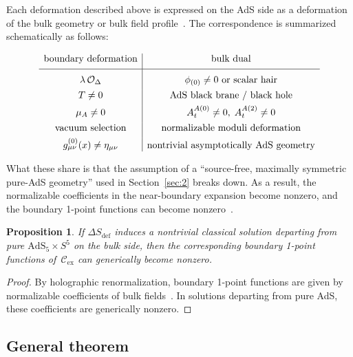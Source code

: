 \documentclass[
  aps,
  prd,
  preprint,
  groupedaddress,
  nofootinbib,
  longbibliography
]{revtex4-2}
\newtheorem{proposition}[definition]{Proposition}
\theoremstyle{remark}
\newcommand{\Cex}{\mathcal{C}_{\mathrm{ex}}}
\newcommand{\AdS}{\mathrm{AdS}}
\begin{document}
Each deformation described above is expressed on the AdS side
as a deformation of the bulk geometry or bulk field
profile~\cite{ref3,ref4,ref9,ref10,ref11,ref12}.
The correspondence is summarized schematically as follows:

\begin{equation}\label{eq:bulk-image}
\begin{array}{c|c}
  \text{boundary deformation} & \text{bulk dual} \\[4pt]
  \hline\rule{0pt}{14pt}
  \lambda\,\mathcal{O}_\Delta
    & \phi_{(0)}\neq 0 \text{ or scalar hair} \\[4pt]
  T\neq 0
    & \text{AdS black brane / black hole} \\[4pt]
  \mu_A\neq 0
    & A_t^{A(0)}\neq 0,\; A_t^{A(2)}\neq 0 \\[4pt]
  \text{vacuum selection}
    & \text{normalizable moduli deformation} \\[4pt]
  g^{(0)}_{\mu\nu}(x)\neq\eta_{\mu\nu}
    & \text{nontrivial asymptotically AdS geometry}
\end{array}
\end{equation}

What these share is that the assumption of a ``source-free,
maximally symmetric pure-AdS geometry'' used in
Section~\ref{sec:2} breaks down.
As a result, the normalizable coefficients in the near-boundary
expansion become nonzero, and the boundary 1-point functions can
become nonzero~\cite{ref9,ref10,ref11,ref12}.

\begin{proposition}\label{prop:bulk-deformation}
If $\Delta S_{\mathrm{def}}$ induces a nontrivial classical
solution departing from pure $\AdS_5\times S^5$ on the bulk side,
then the corresponding boundary 1-point functions of~$\Cex$ can
generically become nonzero.
\end{proposition}

\begin{proof}
By holographic renormalization, boundary 1-point functions are
given by normalizable coefficients of bulk
fields~\cite{ref9,ref10,ref11}.
In solutions departing from pure AdS, these coefficients are
generically nonzero.
\end{proof}

\subsection{General theorem}\label{subsec:3-9}
\end{document}
